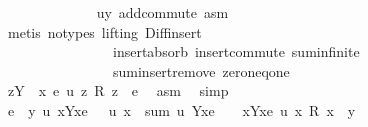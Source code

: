 \begin{isabellebody}
\ \ \ \ \ \ \ \ \ \ \ \ \isamarkupfalse%
\ uy\ add{\isachardot}{\kern0pt}commute\ asm\isanewline
\ \ \ \ \ \ \ \ \ \ \ \ \isamarkupfalse%
\ {\isacharparenleft}{\kern0pt}metis\ {\isacharparenleft}{\kern0pt}no{\isacharunderscore}{\kern0pt}types{\isacharcomma}{\kern0pt}\ lifting{\isacharparenright}{\kern0pt}\ Diff{\isacharunderscore}{\kern0pt}insert{}\isanewline
\ \ \ \ \ \ \ \ \ \ \ \ \ \ \ \ insert{\isacharunderscore}{\kern0pt}absorb\ insert{\isacharunderscore}{\kern0pt}commute\ sum{\isachardot}{\kern0pt}infinite\isanewline
\ \ \ \ \ \ \ \ \ \ \ \ \ \ \ \ sum{\isachardot}{\kern0pt}insert{\isacharunderscore}{\kern0pt}remove\ zero{\isacharunderscore}{\kern0pt}neq{\isacharunderscore}{\kern0pt}one{\isacharparenright}{\kern0pt}\isanewline
\ \ \ \ \ \ \ \ \ \ \isamarkupfalse%
\ {\isachardoublequoteopen}{\isacharparenleft}{\kern0pt}{\isasymSum}z{\isasymin}Y\ {\isacharminus}{\kern0pt}\ {\isacharbraceleft}{\kern0pt}x{\isacharcomma}{\kern0pt}\ e{\isacharbraceright}{\kern0pt}{\isachardot}{\kern0pt}\ u\ z\ {\isacharasterisk}{\kern0pt}\isactrlsub R\ z{\isacharparenright}{\kern0pt}\ {\isacharequal}{\kern0pt}\ e{\isachardoublequoteclose}\ \isamarkupfalse%
\ asm\ \isamarkupfalse%
\ simp\isanewline
\ \ \ \ \ \ \ \ \isamarkupfalse%
\isanewline
\ \ \ \ \ \ \ \ \isamarkupfalse%
\ {\isachardoublequoteopen}e\ {\isasymin}\ {\isacharbraceleft}{\kern0pt}y{\isachardot}{\kern0pt}\ {\isasymexists}u{\isachardot}{\kern0pt}\ {\isacharparenleft}{\kern0pt}{\isasymforall}x{\isasymin}Y{\isacharminus}{\kern0pt}{\isacharbraceleft}{\kern0pt}x{\isacharcomma}{\kern0pt}e{\isacharbraceright}{\kern0pt}{\isachardot}{\kern0pt}\ {}\ {\isasymle}\ u\ x{\isacharparenright}{\kern0pt}\ {\isasymand}\ sum\ u\ {\isacharparenleft}{\kern0pt}Y{\isacharminus}{\kern0pt}{\isacharbraceleft}{\kern0pt}x{\isacharcomma}{\kern0pt}e{\isacharbraceright}{\kern0pt}{\isacharparenright}{\kern0pt}\ {\isacharequal}{\kern0pt}\ {}\ {\isasymand}\ {\isacharparenleft}{\kern0pt}{\isasymSum}x{\isasymin}Y{\isacharminus}{\kern0pt}{\isacharbraceleft}{\kern0pt}x{\isacharcomma}{\kern0pt}e{\isacharbraceright}{\kern0pt}{\isachardot}{\kern0pt}\ u\ x\ {\isacharasterisk}{\kern0pt}\isactrlsub R\ x{\isacharparenright}{\kern0pt}\ {\isacharequal}{\kern0pt}\ y{\isacharbraceright}{\kern0pt}{\isachardoublequoteclose}\isanewline
\ \ \ \ \ \ \ \ \ \ \isamarkupfalse%
\ {\isachardoublequoteopen}{}{\isachardoublequoteclose}\ \isamarkupfalse%

\end{isabellebody}
